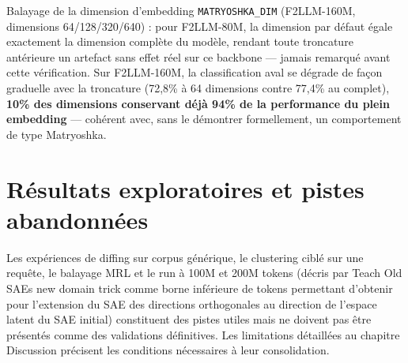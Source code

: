 \documentclass[11pt]{article}
\begin{document}
Balayage de la dimension d'embedding \texttt{MATRYOSHKA\_DIM} (F2LLM-160M,
dimensions 64/128/320/640) : pour F2LLM-80M, la dimension par défaut égale
exactement la dimension complète du modèle, rendant toute troncature
antérieure un artefact sans effet réel sur ce backbone --- jamais remarqué
avant cette vérification. Sur F2LLM-160M, la classification aval se dégrade
de façon graduelle avec la troncature (72,8\% à 64 dimensions contre 77,4\%
au complet), \textbf{10\% des dimensions conservant déjà 94\% de la
performance du plein embedding} --- cohérent avec, sans le démontrer
formellement, un comportement de type Matryoshka.

\section{Résultats exploratoires et pistes abandonnées}

Les expériences de diffing sur corpus générique, le clustering ciblé sur une requête,
le balayage MRL et le run à 100M et 200M tokens (décris par Teach Old SAEs new domain trick comme borne inférieure de tokens permettant d'obtenir pour l'extension du SAE des directions orthogonales au direction de l'espace latent du SAE initial) constituent des pistes utiles mais ne doivent
pas être présentés comme des validations définitives. Les limitations détaillées au
chapitre Discussion précisent les conditions nécessaires à leur consolidation.
\end{document}
